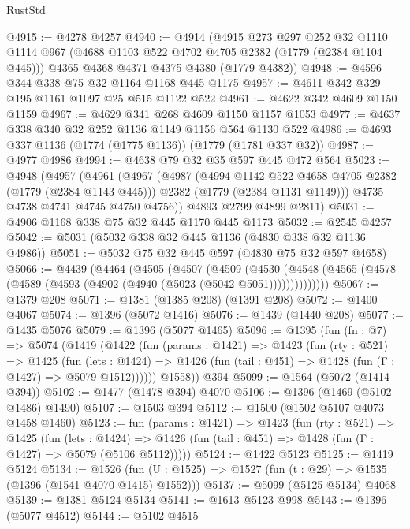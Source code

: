 \begin{lexlean}{RustStd}
\begin{coremodule}
{\begin{coremodule}
{{{{{{{{{{{@4915 := @4278 @4257
@4940 := @4914
    (@4915
      @273
      @297
      @252
      @32
      @1110
      @1114
      @967
      (@4688 @1103 @522 @4702 @4705 @2382 (@1779 (@2384 @1104 @445)))
      @4365
      @4368
      @4371
      @4375
      @4380
      (@1779 @4382))
@4948 := @4596 @344 @338 @75 @32 @1164 @1168 @445 @1175
@4957 := @4611 @342 @329 @195 @1161 @1097 @25 @515 @1122 @522
@4961 := @4622 @342 @4609 @1150 @1159
@4967 := @4629 @341 @268 @4609 @1150 @1157 @1053
@4977 := @4637 @338 @340 @32 @252 @1136 @1149 @1156 @564 @1130 @522
@4986 := @4693 @337 @1136 (@1774 (@1775 @1136)) (@1779 (@1781 @337 @32))
@4987 := @4977 @4986
@4994 := @4638 @79 @32 @35 @597 @445 @472 @564
@5023 := @4948
    (@4957
      (@4961
        (@4967
          (@4987
            (@4994 @1142 @522 @4658 @4705 @2382 (@1779 (@2384 @1143 @445)))
            @2382
            (@1779 (@2384 @1131 @1149)))
          @4735
          @4738
          @4741
          @4745
          @4750
          @4756))
      @4893
      @2799
      @4899
      @2811)
@5031 := @4906 @1168 @338 @75 @32 @445 @1170 @445 @1173
@5032 := @2545 @4257
@5042 := @5031 (@5032 @338 @32 @445 @1136 (@4830 @338 @32 @1136 @4986))
@5051 := @5032 @75 @32 @445 @597 (@4830 @75 @32 @597 @4658)
@5066 := @4439
    (@4464
      (@4505
        (@4507
          (@4509
            (@4530
              (@4548 (@4565 (@4578 (@4589 (@4593 (@4902 (@4940 (@5023 (@5042 @5051))))))))))))))
@5067 := @1379 @208
@5071 := @1381 (@1385 @208) (@1391 @208)
@5072 := @1400 @4067
@5074 := @1396 (@5072 @1416)
@5076 := @1439 (@1440 @208)
@5077 := @1435 @5076
@5079 := @1396 (@5077 @1465)
@5096 := @1395
    (fun (fn : @7) =>
    @5074
      (@1419
        (@1422
          (fun (params : @1421) =>
          @1423
            (fun (rty : @521) =>
            @1425
              (fun (lets : @1424) =>
              @1426 (fun (tail : @451) => @1428 (fun (Γ : @1427) => @5079 @1512))))))
        @1558))
    @394
@5099 := @1564 (@5072 (@1414 @394))
@5102 := @1477 (@1478 @394) @4070
@5106 := @1396 (@1469 (@5102 @1486) @1490)
@5107 := @1503 @394
@5112 := @1500 (@1502 @5107 @4073 @1458 @1460)
@5123 := fun (params : @1421) =>
  @1423
    (fun (rty : @521) =>
    @1425
      (fun (lets : @1424) =>
      @1426 (fun (tail : @451) => @1428 (fun (Γ : @1427) => @5079 (@5106 @5112)))))
@5124 := @1422 @5123
@5125 := @1419 @5124
@5134 := @1526 (fun (U : @1525) => @1527 (fun (t : @29) => @1535 (@1396 (@1541 @4070 @1415) @1552)))
@5137 := @5099 (@5125 @5134) @4068
@5139 := @1381 @5124 @5134
@5141 := @1613 @5123 @998
@5143 := @1396 (@5077 @4512)
@5144 := @5102 @4515
}}}}}}}}}}}
\end{coremodule}}
\end{coremodule}
\end{lexlean}
